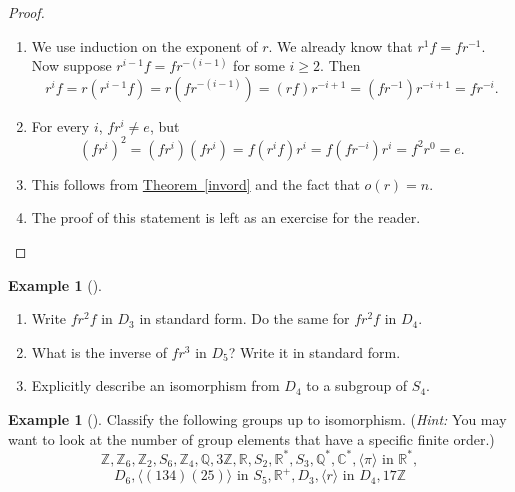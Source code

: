 \documentclass[10pt,]{book}
\theoremstyle{plain}
\theoremstyle{definition}
\theoremstyle{definition}
\theoremstyle{definition}
\newtheorem{example}[theorem]{Example}
\theoremstyle{definition}
\numberwithin{equation}{section}
\def\Z{\mathbb{Z}}
\def\R{\mathbb{R}}
\def\Q{\mathbb{Q}}
\def\C{\mathbb{C}}
\begin{document}
\begin{proof}\hypertarget{proof-34}{}
\leavevmode%
\begin{enumerate}
\item\hypertarget{li-356}{}We use induction on the exponent of \(r\). We already know that \(r^1f=fr^{-1}\).  Now suppose \(r^{i-1}f=fr^{-(i-1)}\) for some \(i\geq 2\).  Then%
\begin{equation*}
r^if=r(r^{i-1}f)=r(fr^{-(i-1)})=(rf)r^{-i+1}=(fr^{-1})r^{-i+1}=fr^{-i}.
\end{equation*}
%
\item\hypertarget{li-357}{}For every \(i\), \(fr^i\neq e\), but%
\begin{equation*}
(fr^i)^2=(fr^i)(fr^i)=f(r^if)r^i=f(fr^{-i})r^i=f^2r^0=e.
\end{equation*}
%
\item\hypertarget{li-358}{}This follows from \hyperref[invord]{Theorem~\ref{invord}} and the fact that \(o(r)=n\).%
\item\hypertarget{li-359}{}The proof of this statement is left as an exercise for the reader.%
\end{enumerate}
\end{proof}
\begin{example}[]\label{example-61}
\leavevmode%
\begin{enumerate}
\item\hypertarget{li-360}{}Write \(fr^2f\) in \(D_3\) in standard form.  Do the same for \(fr^2f\) in \(D_4\).%
\item\hypertarget{li-361}{}What is the inverse of \(fr^3\) in \(D_5\)?  Write it in standard form.%
\item\hypertarget{li-362}{}Explicitly describe an isomorphism from \(D_4\) to a subgroup of \(S_4\).%
\end{enumerate}
\end{example}
\begin{example}[]\label{example-62}
Classify the following groups up to isomorphism. (\emph{Hint:} You may want to look at the number of group elements that have a specific finite order.)%
\begin{equation*}
\Z, \Z_6, \Z_2, S_6, \Z_4, \Q, 3\Z, \R, S_2, \R^*, S_3,\Q^*, \C^*, \langle \pi\rangle \text{ in } \R^*,
\end{equation*}
%
\begin{equation*}
D_6, 
\langle (134)(25)\rangle \text{ in } S_5, \R^+, D_3, \langle r \rangle \text{ in } D_4, 17\Z
\end{equation*}
%
\end{example}
\typeout{************************************************}
\typeout{************************************************}
\end{document}
